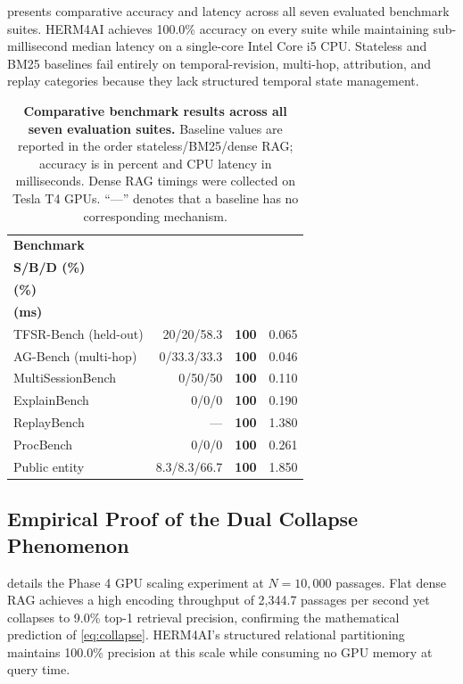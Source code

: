 \documentclass[11pt,a4paper,twocolumn]{article}
\newcommand{\herm}{\textsc{HERM4AI}}
\begin{document}
 presents comparative accuracy and latency
across all seven evaluated benchmark suites.  \herm{} achieves 100.0\%
accuracy on every suite while maintaining sub-millisecond median latency
on a single-core Intel Core i5 CPU.  Stateless and BM25 baselines fail
entirely on temporal-revision, multi-hop, attribution, and replay
categories because they lack structured temporal state management.

\begin{table}[t]
\centering
\footnotesize
\setlength{\tabcolsep}{2.5pt}
\renewcommand{\arraystretch}{1.15}
\begin{tabular}{@{}p{2.75cm}rrr@{}}
\toprule
\textbf{Benchmark}
  & \makecell{\textbf{Baselines}\\\textbf{S/B/D (\%)}}
  & \makecell{\textbf{\herm{}}\\\textbf{(\%)}}
  & \makecell{\textbf{CPU}\\\textbf{(ms)}} \\
\midrule
TFSR-Bench (held-out) & 20/20/58.3 & \textbf{100} & 0.065 \\
AG-Bench (multi-hop)  & 0/33.3/33.3 & \textbf{100} & 0.046 \\
MultiSessionBench     & 0/50/50 & \textbf{100} & 0.110 \\
ExplainBench          & 0/0/0 & \textbf{100} & 0.190 \\
ReplayBench           & --- & \textbf{100} & 1.380 \\
ProcBench             & 0/0/0 & \textbf{100} & 0.261 \\
Public entity         & 8.3/8.3/66.7 & \textbf{100} & 1.850 \\
\bottomrule
\end{tabular}
\caption{\textbf{Comparative benchmark results across all seven evaluation
suites.} Baseline values are reported in the order stateless/BM25/dense
RAG; accuracy is in percent and CPU latency in milliseconds. Dense RAG
timings were collected on Tesla T4 GPUs. ``---'' denotes that a baseline
has no corresponding mechanism.}
\label{tab:core_benchmarks}
\end{table}

\subsection{Empirical Proof of the Dual Collapse Phenomenon}
\label{sec:results_collapse}

 details the Phase 4 GPU scaling experiment at
$N=10{,}000$ passages.  Flat dense RAG achieves a high encoding
throughput of 2{,}344.7 passages per second yet collapses to 9.0\%
top-1 retrieval precision, confirming the mathematical prediction of
\cref{eq:collapse}.  \herm{}'s structured relational partitioning
maintains 100.0\% precision at this scale while consuming no GPU memory
at query time.
\end{document}
